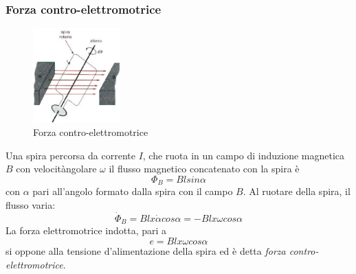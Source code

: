 \documentclass[a4paper]{report}
\begin{document}
\subsubsection{Forza contro-elettromotrice}
\begin{figure}[!h]
\centering
\includegraphics[width=0.3\textwidth]{./images/forza-magnetica04.png}
\caption{Forza contro-elettromotrice\label{fig:forza-magnetica04}}
\end{figure}
Una spira percorsa da corrente $I$, che ruota in un campo di induzione
magnetica $B$ con velocit\` angolare $\omega$ il flusso magnetico
concatenato con la spira \`e
\[
  \Phi_B = B l sin \alpha
\]
con $\alpha$ pari all'angolo formato dalla spira con il campo $B$. Al
ruotare della spira, il flusso varia:
\[
  \dot{\Phi}_B = B l x \dot{\alpha} cos \alpha = - B l x \omega cos \alpha
\]
La forza elettromotrice indotta, pari a
\[
  e = B l x \omega cos \alpha
\]
si oppone alla tensione d'alimentazione della spira ed \`e detta {\em
  forza contro-elettromotrice}.
\end{document}
